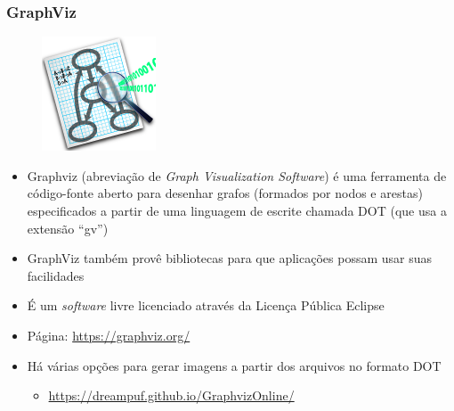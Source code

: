 \documentclass[aspectratio=169]{beamer}
\begin{document}
\begin{frame}\frametitle{GraphViz}
\vspace{-2mm}
\begin{figure}[h]
	\centering
	\includegraphics[height=0.25\paperheight]{imagens/graphviz.png}
\end{figure}
\vspace{-3mm}
\begin{itemize}
	\item Graphviz (abreviação de \emph{Graph Visualization Software}) é uma ferramenta de código-fonte aberto para desenhar grafos (formados por nodos e arestas) especificados a partir de uma linguagem de escrite chamada DOT (que usa a extensão ``gv'')
	\item GraphViz também provê bibliotecas para que aplicações possam usar suas facilidades
	\item É um \emph{software} livre licenciado através da Licença Pública Eclipse
	\item Página: \url{https://graphviz.org/}
	\item Há várias opções para gerar imagens a partir dos arquivos no formato DOT
	\begin{itemize}
		\item \url{https://dreampuf.github.io/GraphvizOnline/}
	\end{itemize}
\end{itemize}
\end{frame}
\end{document}

